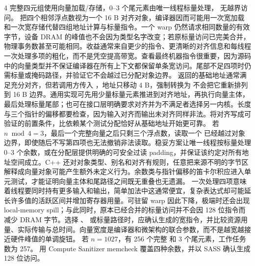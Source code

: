 \begin{solutionexercise}{4}
\conclusionheading 完整四元组使用向量加载/存储，0--3 个尾元素由唯一线程标量处理，
无越界访问。
\discussionheading
{}
 把四个相邻浮点数视为一个 16 B 对齐对象，编译器因而可能用一次宽加载和一次宽存储代替四组地址计算与标量指令。一个 warp 仍然请求相同数量的有效字节，设备 DRAM 的峰值也不会因为类型名字改变；若原标量访问已完美合并，物理事务数甚至可能相同。收益通常来自更少的指令、更清晰的对齐信息和每线程一次处理多项的粗化，而不是凭空提高带宽。查看最终机器指令很重要，因为源码中的向量类型并不保证编译器在所有上下文都保留单条宽访问。尾部不足四项时仍需标量或掩码路径，并验证它不会越过已分配对象边界。
 返回的基础地址通常满足充分对齐，但若调用方传入 ，地址只移动 4 B，强制转换为  不会把它重新排列到 16 B 边界。通用实现可先用少量标量元素推进到对齐地址，再执行向量主体，最后处理标量尾部；也可在接口层明确要求对齐并为不满足者选择另一内核。长度与三个指针的偏移都要检查，因为输入对齐而输出未对齐同样非法。将对齐写成可验证的前置条件，比依赖某个测试分配恰好从基础地址开始更可靠。
若 $n\bmod4=3$，最后一个完整向量之后只剩三个浮点数，读取一个  已经越过对象边界，即使随后不写第四项也无法撤销非法读取。稳妥方案让唯一线程按标量处理 0--3 个余数，或在分配层提供明确的可安全过读 padding，并保证该约定对所有地址空间成立。C++ 还对对象类型、别名和对齐有规则，任意把来源不明的字节区解释成向量对象可能产生额外未定义行为。余数类与指针偏移的笛卡尔积应进入单元测试，才能证明向量主体和尾路径之间既无重叠也无遗漏。
一次处理四项意味着线程要同时持有更多输入和输出，简单加法中这通常便宜，复杂表达式却可能延长许多值的活跃区间并增加寄存器用量。可驻留 warp 因此下降，极端时还会出现 local-memory spill；与此同时，原本已经合并的标量访问并不会因 128 位指令而减少 DRAM 字节。选择 、 或标量路径时，应确认生成的宽指令，并比较资源用量、实际传输与总时间。向量宽度是编译器和微架构的联合参数，而不是越宽越接近硬件峰值的单调旋钮。
\variantheading 若 $n=1027$，有 256 个完整  和 3 个尾元素，工作任务数为 257。
\practiceheading 用 Compute Sanitizer memcheck 覆盖四种余数，并以 SASS 确认生成 128 位访问。
\end{solutionexercise}


